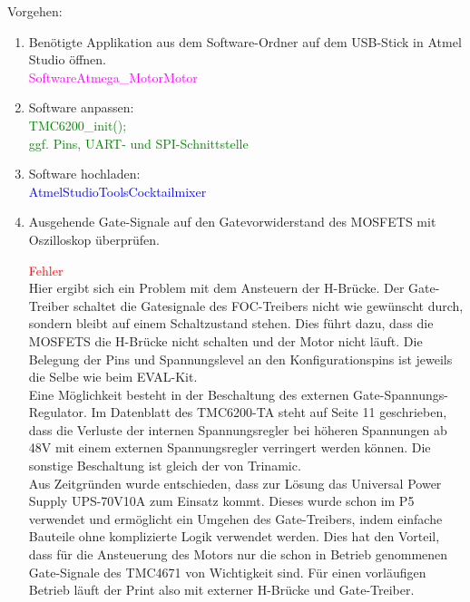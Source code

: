 Vorgehen:
\begin{enumerate}
\item Benötigte Applikation aus dem Software-Ordner auf dem USB-Stick in Atmel Studio öffnen.\\
\textcolor{magenta}{Software\textrightarrow Atmega\_Motor\textrightarrow Motor}\\

\item Software anpassen:\\
\textcolor{green}{
TMC6200\_init();\\
ggf. Pins, UART- und SPI-Schnittstelle\\
}
\item Software hochladen:\\
\textcolor{blue}{AtmelStudio\textrightarrow Tools\textrightarrow Cocktailmixer}\\

\item Ausgehende Gate-Signale auf den Gatevorwiderstand des MOSFETS mit Oszilloskop überprüfen.


\textcolor{red}{Fehler}\\
Hier ergibt sich ein Problem mit dem Ansteuern der H-Brücke. Der Gate-Treiber schaltet die Gatesignale des FOC-Treibers nicht wie gewünscht durch, sondern bleibt auf einem Schaltzustand stehen. Dies führt dazu, dass die MOSFETS die H-Brücke nicht schalten und der Motor nicht läuft. Die Belegung der Pins und Spannungslevel an den Konfigurationspins ist jeweils die Selbe wie beim EVAL-Kit.\\

Eine Möglichkeit besteht in der Beschaltung des externen Gate-Spannungs-Regulator. Im Datenblatt des TMC6200-TA steht auf Seite 11 geschrieben, dass die Verluste der internen Spannungsregler bei höheren Spannungen ab 48V mit einem externen Spannungsregler verringert werden können. Die sonstige Beschaltung ist gleich der von Trinamic.\\

Aus Zeitgründen wurde entschieden, dass zur Lösung das Universal Power Supply UPS-70V10A zum Einsatz kommt. Dieses wurde schon im P5 verwendet und ermöglicht ein Umgehen des Gate-Treibers, indem einfache Bauteile ohne komplizierte Logik verwendet werden. Dies hat den Vorteil, dass für die Ansteuerung des Motors nur die schon in Betrieb genommenen Gate-Signale des TMC4671 von Wichtigkeit sind. Für einen vorläufigen Betrieb läuft der Print also mit externer H-Brücke und Gate-Treiber.

\end{enumerate}